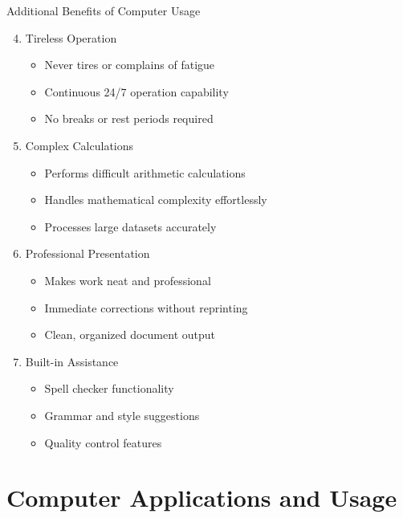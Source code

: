 \documentclass[aspectratio=169]{beamer}
\begin{document}
\begin{frame}{Additional Benefits of Computer Usage}
    \begin{enumerate}
        \setcounter{enumi}{3}
        \item Tireless Operation
        \begin{itemize}
            \item Never tires or complains of fatigue
            \item Continuous 24/7 operation capability
            \item No breaks or rest periods required
        \end{itemize}
        
        \item Complex Calculations
        \begin{itemize}
            \item Performs difficult arithmetic calculations
            \item Handles mathematical complexity effortlessly
            \item Processes large datasets accurately
        \end{itemize}
        
        \item Professional Presentation
        \begin{itemize}
            \item Makes work neat and professional
            \item Immediate corrections without reprinting
            \item Clean, organized document output
        \end{itemize}
        
        \item Built-in Assistance
        \begin{itemize}
            \item Spell checker functionality
            \item Grammar and style suggestions
            \item Quality control features
        \end{itemize}
    \end{enumerate}
\end{frame}

\section{Computer Applications and Usage}
\end{document}
